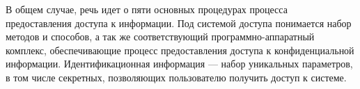 В общем случае, речь идет о пяти основных процедурах процесса
предоставления доступа к информации.
Под системой доступа понимается набор методов и способов, а так же
соответствующий программно-аппаратный комплекс, обеспечивающие процесс
предоставления доступа к конфиденциальной информации.
Идентификационная информация --- набор уникальных параметров, в том числе
секретных, позволяющих пользователю получить доступ к системе.
%
%
\actualitysection
\actualitytext
\objectsection
\objecttext
\subjectsection
\subjecttext
\objectivesection
\objectivetext
\noveltysection
\noveltytext
{}
\resultssection
\resultstext
\approbationsection
\approbationtext
\pubsection
\pubtext
\contribsection
\contribtext
\structsection
\structtext